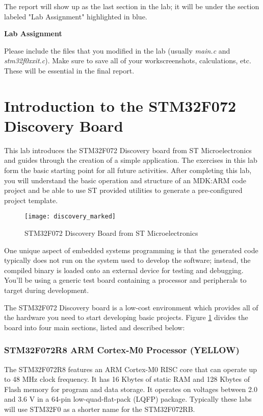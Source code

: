 \documentclass[openany,11pt,fleqn]{book} %
\begin{document}
The report will show up as the last section in the lab; it will be under the section labeled "Lab Assignment" highlighted in blue.

{\addvspace{6pt}\sffamily\bfseries\centering\contentslabel[\thecontentslabel]{1.25cm}\color{blue}Lab Assignment}
\vspace{3mm}

Please include the files that you modified in the lab (usually \textit{main.c} and \textit{stm32f0xx\textunderscore it.c}). Make sure to save all of your work\textemdash screenshots, calculations, etc. These will be essential in the final report.

\section{\color{orange}Introduction to the STM32F072 Discovery Board}
This lab introduces the STM32F072 Discovery board from ST Microelectronics and guides through the creation of a simple application. The exercises in this lab form the basic starting point for all future activities. After completing this lab, you will understand the basic operation and structure of an MDK:ARM code project and be able to use ST provided utilities to generate a pre-configured project template. 

\begin{figure}[h]
	\centering\texttt{[image: discovery\_marked]}
	\caption{STM32F072 Discovery Board from ST Microelectronics}
	\label{discovery_marked_col}
\end{figure}

One unique aspect of embedded systems programming is that the generated code typically does not run on the system used to develop the software; instead, the compiled binary is loaded onto an external device for testing and debugging. You'll be using a generic test board containing a processor and peripherals to target during development. 

The STM32F072 Discovery board is a low-cost environment which provides all of the hardware you need to start developing basic projects. Figure \ref{discovery_marked_col} divides the board into four main sections, listed and described below: 

\subsubsection*{STM32F072R8 ARM Cortex-M0 Processor ({\color{yellow!80!black}YELLOW})}
The STM32F072R8 features an ARM Cortex-M0 RISC core that can operate up to 48 MHz clock frequency. It has 16 Kbytes of static RAM and 128 Kbytes of Flash memory for program and data storage. It operates on voltages between 2.0 and 3.6 V in a 64-pin low-quad-flat-pack (LQFP) package. Typically these labs will use STM32F0 as a shorter name for the STM32F072RB.
\end{document}
